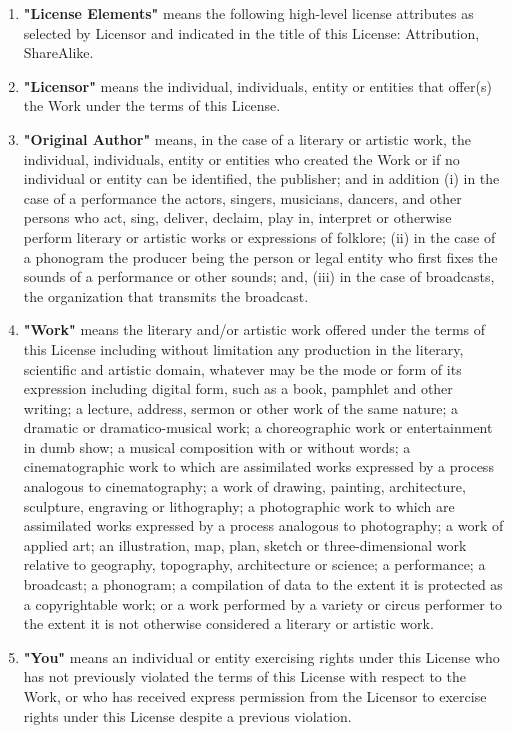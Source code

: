 \begin{enumerate}[noitemsep,label=\alph*.]
      \item \textbf{"License Elements"} means the following high-level license attributes as selected by Licensor and indicated in the title of this License: Attribution, ShareAlike.
      
      \item \textbf{"Licensor"} means the individual, individuals, entity or entities that offer(s) the Work under the terms of this License.
      
      \item \textbf{"Original Author"} means, in the case of a literary or artistic work, the individual, individuals, entity or entities who created the Work or if no individual or entity can be identified, the publisher; and in addition (i) in the case of a performance the actors, singers, musicians, dancers, and other persons who act, sing, deliver, declaim, play in, interpret or otherwise perform literary or artistic works or expressions of folklore; (ii) in the case of a phonogram the producer being the person or legal entity who first fixes the sounds of a performance or other sounds; and, (iii) in the case of broadcasts, the organization that transmits the broadcast.
      
      \item \textbf{"Work"} means the literary and/or artistic work offered under the terms of this License including without limitation any production in the literary, scientific and artistic domain, whatever may be the mode or form of its expression including digital form, such as a book, pamphlet and other writing; a lecture, address, sermon or other work of the same nature; a dramatic or dramatico-musical work; a choreographic work or entertainment in dumb show; a musical composition with or without words; a cinematographic work to which are assimilated works expressed by a process analogous to cinematography; a work of drawing, painting, architecture, sculpture, engraving or lithography; a photographic work to which are assimilated works expressed by a process analogous to photography; a work of applied art; an illustration, map, plan, sketch or three-dimensional work relative to geography, topography, architecture or science; a performance; a broadcast; a phonogram; a compilation of data to the extent it is protected as a copyrightable work; or a work performed by a variety or circus performer to the extent it is not otherwise considered a literary or artistic work.
      
      \item \textbf{"You"} means an individual or entity exercising rights under this License who has not previously violated the terms of this License with respect to the Work, or who has received express permission from the Licensor to exercise rights under this License despite a previous violation.
      

\end{enumerate}
